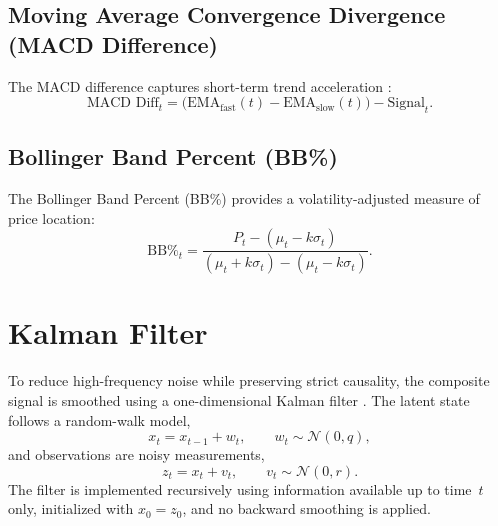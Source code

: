 \documentclass[final,5p,times,twocolumn]{elsarticle}
\begin{document}
\subsection{Moving Average Convergence Divergence (MACD Difference)}
The MACD difference captures short-term trend acceleration \cite{appel1979}:
\begin{equation}
\text{MACD Diff}_t =
\bigl(\text{EMA}_{\text{fast}}(t) - \text{EMA}_{\text{slow}}(t)\bigr)
- \text{Signal}_t.
\end{equation}

\subsection{Bollinger Band Percent (BB\%)}
The Bollinger Band Percent (BB\%) provides a volatility-adjusted measure of price location:
\begin{equation}
\text{BB\%}_t =
\frac{P_t - (\mu_t - k\sigma_t)}{(\mu_t + k\sigma_t) - (\mu_t - k\sigma_t)}.
\end{equation}

\section{Kalman Filter}
\label{app:kalman}

To reduce high-frequency noise while preserving strict causality, the composite signal is smoothed using a one-dimensional Kalman filter \cite{kalman1960}.
The latent state follows a random-walk model,
\begin{equation}
x_t = x_{t-1} + w_t, \qquad w_t \sim \mathscr{N}(0,q),
\end{equation}
and observations are noisy measurements,
\begin{equation}
z_t = x_t + v_t, \qquad v_t \sim \mathscr{N}(0,r).
\end{equation}
The filter is implemented recursively using information available up to time~$t$ only, initialized with $x_0 = z_0$, and no backward smoothing is applied.
\end{document}
